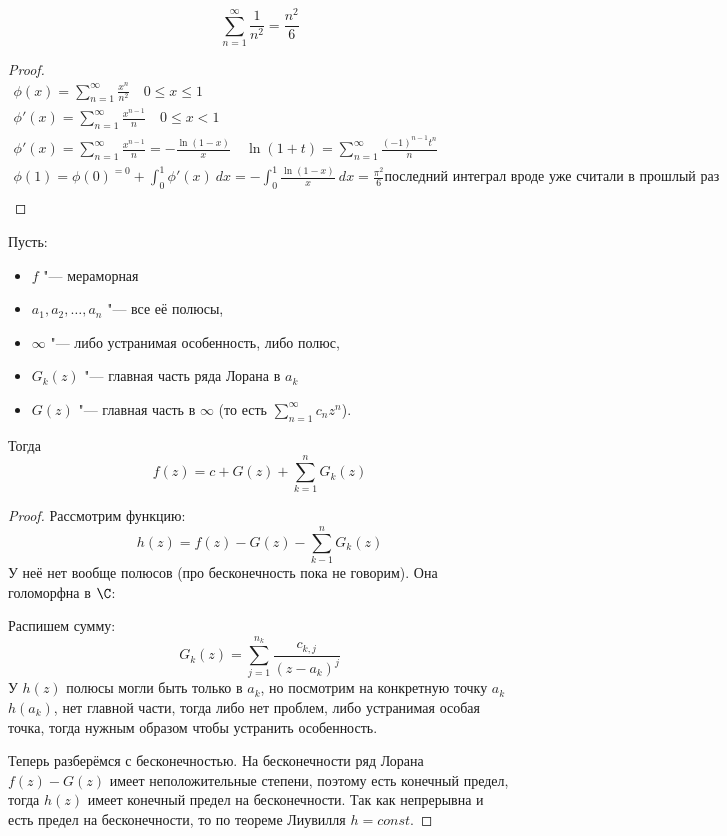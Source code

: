 \begin{theorem}
\[ \sum_{n=1}^\infty \frac{1}{n^2} = \frac{n^2}{6} \]
\end{theorem}

\begin{proof}
	\begin{gather*}
		\phi(x) = \sum_{n=1}^\infty \frac{x^n}{n^2} \quad 0 \le x \le 1 \\
		\phi'(x) = \sum_{n=1}^\infty \frac{x^{n-1}}{n} \quad 0 \le x < 1 \\
		\phi'(x) = \sum_{n=1}^\infty \frac{x^{n-1}}{n} = -\frac{\ln(1-x)}{x} \quad \ln(1 + t) = \sum_{n=1}^\infty \frac{(-1)^{n-1}t^n}{n} \\
		\phi(1) = \phi(0)^{=0} + \int_0^1 \phi'(x) \ dx = - \int_0^1 \frac{\ln(1-x)}{x} \ dx = \frac{\pi^2}{6} \text{последний интеграл вроде уже считали в прошлый раз} \\
	\end{gather*}
\end{proof}

\begin{theorem}
	Пусть:
	\begin{itemize}
		\item $f$ "--- мераморная
		\item $a_1, a_2, \ldots, a_n$ "--- все её полюсы,
		\item $\infty$ "--- либо устранимая особенность, либо полюс,
		\item $G_k(z)$ "--- главная часть ряда Лорана в $a_k$
		\item $G(z)$ "--- главная часть в $\infty$ (то есть $\sum_{n=1}^\infty c_n z^n$).
	\end{itemize}
	Тогда
	\[ f(z) = c + G(z) + \sum_{k=1}^n G_k(z) \]
\end{theorem}

\begin{proof}
	Рассмотрим функцию:
	\[ h(z) = f(z) - G(z) - \sum_{k-1}^n G_k(z) \]
	У неё нет вообще полюсов (про бесконечность пока не говорим).
	Она голоморфна в $\C$:

	Распишем сумму:
	\[ G_k(z) = \sum_{j=1}^{n_k} \frac{c_{k, j}}{(z-a_k)^j} \]
	У $h(z)$ полюсы могли быть только в $a_k$, но посмотрим на конкретную точку $a_k$
	$h(a_k)$, нет главной части, тогда либо нет проблем, либо устранимая особая точка,
	тогда нужным образом чтобы устранить особенность.

	Теперь разберёмся с бесконечностью.
	На бесконечности ряд Лорана $f(z) - G(z)$ имеет неположительные степени,
	поэтому есть конечный предел, тогда $h(z)$ имеет конечный предел на бесконечности.
	Так как непрерывна и есть предел на бесконечности, то по теореме Лиувилля $h = const$.
\end{proof}

